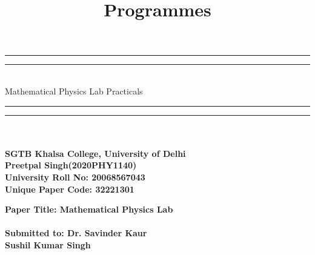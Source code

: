 \documentclass{article}
\title{Programmes}
\date{ }
\begin{document}
\begin{center}


\rule{\textwidth}{1.6pt}\vspace*{-\baselineskip}\vspace*{2pt} %
\rule{\textwidth}{0.4pt}\\[\baselineskip] %

{\LARGE Mathematical Physics Lab Practicals \\[0.2\baselineskip] }%

\rule{\textwidth}{0.4pt}\vspace*{-\baselineskip}\vspace{3.2pt} %
\rule{\textwidth}{1.6pt}\\[2\baselineskip] %

\textbf{\Large \\[\baselineskip] SGTB Khalsa College, University of Delhi}\\[\baselineskip]
\textbf{\Large Preetpal Singh(2020PHY1140)}\\[\baselineskip] 

\vspace*{\baselineskip}
\textbf{\Large University Roll No: 20068567043}\\[\baselineskip] 
\vspace*{\baselineskip}
\textbf{\Large Unique Paper Code: 32221301}\\[\baselineskip] 
\vspace*{\baselineskip}
 
\textbf{\Large Paper Title: Mathematical Physics Lab}\\[\baselineskip] 
\vspace*{\baselineskip}
\textbf{\Large \\[\baselineskip] Submitted to: Dr. Savinder Kaur}\\[\baselineskip]
\textbf{\Large Sushil Kumar Singh}\\[\baselineskip]

\end{center}
\newpage

\maketitle
  
\end{document}
